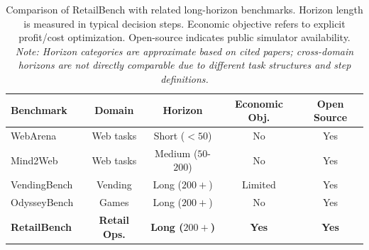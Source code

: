 \begin{table}[t]
\centering
\small
\caption{Comparison of RetailBench with related long-horizon benchmarks. Horizon length is measured in typical decision steps. Economic objective refers to explicit profit/cost optimization. Open-source indicates public simulator availability. \footnotesize{\textit{Note: Horizon categories are approximate based on cited papers; cross-domain horizons are not directly comparable due to different task structures and step definitions.}}}
\label{tab:novelty_comparison}
\begin{tabular}{lcccc}
\toprule
Benchmark & Domain & Horizon & Economic Obj. & Open Source \\
\midrule
WebArena~\citep{webarenarea} & Web tasks & Short ($<50$) & No & Yes \\
Mind2Web~\citep{mind2web} & Web tasks & Medium ($50$-$200$) & No & Yes \\
VendingBench~\citep{andonlabs2025vendingbench2} & Vending & Long ($200+$) & Limited & Yes \\
OdysseyBench~\citep{odysseybenchevaluatesllmagents} & Games & Long ($200+$) & No & Yes \\
\textbf{RetailBench} & \textbf{Retail Ops.} & \textbf{Long ($200+$)} & \textbf{Yes} & \textbf{Yes} \\
\bottomrule
\end{tabular}
\end{table}